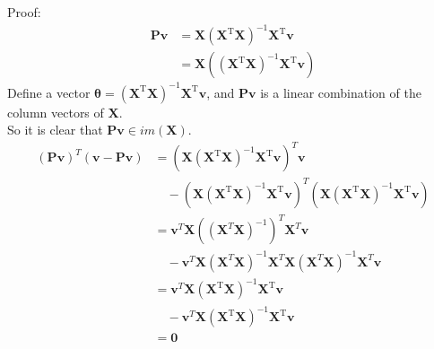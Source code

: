 \documentclass[a4paper]{article}
\begin{document}
\begin{enumerate}
  Proof:
  \begin{equation*}
    \begin{aligned}
      \boldsymbol{P}\boldsymbol{v} 
      & = \boldsymbol{X}\left(\boldsymbol{X}^{\mathrm{T}} \boldsymbol{X}\right)^{-1} \boldsymbol{X}^{\mathrm{T}} \boldsymbol{v}\\
      & = \boldsymbol{X}(\left(\boldsymbol{X}^{\mathrm{T}} \boldsymbol{X}\right)^{-1} \boldsymbol{X}^{\mathrm{T}} \boldsymbol{v})
    \end{aligned}
  \end{equation*}
  \quad Define a vector $\boldsymbol{\theta} = \left(\boldsymbol{X}^{\mathrm{T}} \boldsymbol{X}\right)^{-1} \boldsymbol{X}^{\mathrm{T}} \boldsymbol{v}$, and $\boldsymbol{P} \boldsymbol{v}$ is a linear combination of the column vectors of $\boldsymbol{X}$. \\
  \quad So it is clear that $\boldsymbol{P} \boldsymbol{v} \in im(\boldsymbol{X})$.
  \begin{equation*}
    \begin{aligned}
      (\boldsymbol{P} \boldsymbol{v})^T (\boldsymbol{v}-\boldsymbol{P} \boldsymbol{v})
      &= (\boldsymbol{X}\left(\boldsymbol{X}^{\mathrm{T}} \boldsymbol{X}\right)^{-1} \boldsymbol{X}^{\mathrm{T}}\boldsymbol{v})^T \boldsymbol{v}\\
      &\quad - (\boldsymbol{X}\left(\boldsymbol{X}^{\mathrm{T}} \boldsymbol{X}\right)^{-1} \boldsymbol{X}^{\mathrm{T}}\boldsymbol{v})^T(\boldsymbol{X}\left(\boldsymbol{X}^{\mathrm{T}} \boldsymbol{X}\right)^{-1} \boldsymbol{X}^{\mathrm{T}}\boldsymbol{v})\\
      &=\boldsymbol{v}^T \boldsymbol{X} ((\boldsymbol{X}^T \boldsymbol{X})^{-1})^T \boldsymbol{X}^T \boldsymbol{v} \\
      &\quad -\boldsymbol{v}^T \boldsymbol{X} (\boldsymbol{X}^T \boldsymbol{X})^{-1} \boldsymbol{X}^T \boldsymbol{X} (\boldsymbol{X}^T \boldsymbol{X})^{-1} \boldsymbol{X}^T \boldsymbol{v}\\
      &=\boldsymbol{v}^T \boldsymbol{X}\left(\boldsymbol{X}^{\mathrm{T}} \boldsymbol{X}\right)^{-1} \boldsymbol{X}^{\mathrm{T}}\boldsymbol{v}\\ 
      &\quad -\boldsymbol{v}^T \boldsymbol{X}\left(\boldsymbol{X}^{\mathrm{T}} \boldsymbol{X}\right)^{-1} \boldsymbol{X}^{\mathrm{T}}\boldsymbol{v}\\
      &=\boldsymbol{0}
    \end{aligned}
  \end{equation*}
  \begin{equation*}

\end{equation*}
\end{enumerate}
\end{document}
